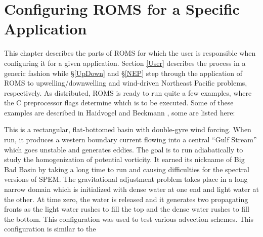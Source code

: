 \section{Configuring ROMS for a Specific Application}
\label{Wave}
This chapter describes the parts of ROMS for which the user is
responsible when configuring it for a given application.  Section
\ref{User} describes the process in a generic fashion while
\S\ref{UpDown} and \S\ref{NEP} step through the application of ROMS
to upwelling/downwelling and wind-driven Northeast Pacific problems,
respectively.  As distributed, ROMS is ready to run quite a few
examples, where the C preprocessor flags determine which is to be
executed.  Some of these examples are described in Haidvogel and
Beckmann \cite{Haidvogel99}, some are listed here:
\begin{klist}
    This is a rectangular, flat-bottomed basin with
 double-gyre wind forcing. When run, it produces a western boundary
 current flowing into a central ``Gulf Stream''
 which goes unstable and generates eddies. The goal is to run
 adiabatically to study the homogenization of potential vorticity.
 It earned its nickname of Big Bad Basin by taking a long time to
 run and causing difficulties for the spectral versions of SPEM.
    The gravitational adjustment problem takes place
 in a long narrow domain which is initialized with dense water at one
 end and light water at the other. At time zero, the water is released
 and it generates two propagating fronts as the light water rushes to
 fill the top and the dense water rushes to fill the bottom. This
 configuration was used to test various advection schemes.
      This configuration is similar to the

\end{klist}
